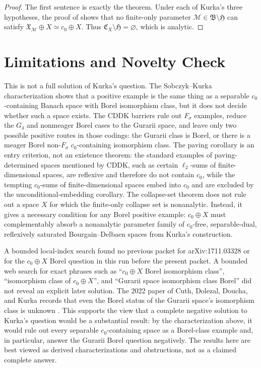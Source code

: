\documentclass[11pt]{article}
\begin{document}
\begin{proof}
The first sentence is exactly the theorem.  Under each of Kurka's three hypotheses, the proof of \cite[Theorem 1.2]{Kurka} shows that no finite-only parameter \(\mathcal M\in\mathfrak B\setminus\mathfrak H\) can satisfy \(\mathfrak X_{\mathcal M}\oplus X\simeq c_0\oplus X\).  Thus \(\mathfrak C_X\setminus\mathfrak H=\varnothing\), which is analytic.
\end{proof}

\section*{Limitations and Novelty Check}

This is not a full solution of Kurka's question.  The Sobczyk--Kurka characterization shows that a positive example is the same thing as a separable \(c_0\)-containing Banach space with Borel isomorphism class, but it does not decide whether such a space exists.  The CDDK barriers rule out \(F_\sigma\) examples, reduce the \(G_\delta\) and nonmeager Borel cases to the Gurarii space, and leave only two possible positive routes in those codings: the Gurarii class is Borel, or there is a meager Borel non-\(F_\sigma\) \(c_0\)-containing isomorphism class.  The paving corollary is an entry criterion, not an existence theorem: the standard examples of paving-determined spaces mentioned by CDDK, such as certain \(\ell_2\)-sums of finite-dimensional spaces, are reflexive and therefore do not contain \(c_0\), while the tempting \(c_0\)-sums of finite-dimensional spaces embed into \(c_0\) and are excluded by the unconditional-embedding corollary.  The collapse-set theorem does not rule out a space \(X\) for which the finite-only collapse set is nonanalytic.  Instead, it gives a necessary condition for any Borel positive example: \(c_0\oplus X\) must complementably absorb a nonanalytic parameter family of \(c_0\)-free, separable-dual, reflexively saturated Bourgain--Delbaen spaces from Kurka's construction.

A bounded local-index search found no previous packet for arXiv:1711.03328 or for the \(c_0\oplus X\) Borel question in this run before the present packet.  A bounded web search for exact phrases such as ``\(c_0\oplus X\) Borel isomorphism class'', ``isomorphism class of \(c_0\oplus X\)'', and ``Gurarii space isomorphism class Borel'' did not reveal an explicit later solution.  The 2022 paper of Cuth, Dolezal, Doucha, and Kurka records that even the Borel status of the Gurarii space's isomorphism class is unknown \cite[Question 6.2]{CDDK}.  This supports the view that a complete negative solution to Kurka's question would be a substantial result: by the characterization above, it would rule out every separable \(c_0\)-containing space as a Borel-class example and, in particular, answer the Gurarii Borel question negatively.  The results here are best viewed as derived characterizations and obstructions, not as a claimed complete answer.
\end{document}

